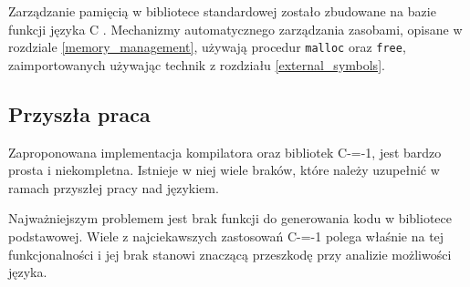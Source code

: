 Zarządzanie pamięcią w bibliotece standardowej zostało zbudowane na bazie funkcji języka C \cite{cLangStandard}.
Mechanizmy automatycznego zarządzania zasobami, opisane w rozdziale \ref{memory_management}, używają procedur \lstinline{malloc} oraz \lstinline{free}, zaimportowanych używając technik z rozdziału \ref{external_symbols}.

\subsection{Przyszła praca}

Zaproponowana implementacja kompilatora oraz bibliotek C-=-1, jest bardzo prosta i niekompletna.
Istnieje w niej wiele braków, które należy uzupełnić w ramach przyszłej pracy nad językiem.

Najważniejszym problemem jest brak funkcji do generowania kodu w bibliotece podstawowej.
Wiele z najciekawszych zastosowań C-=-1 polega właśnie na tej funkcjonalności i jej brak stanowi znaczącą przeszkodę przy analizie możliwości języka.
